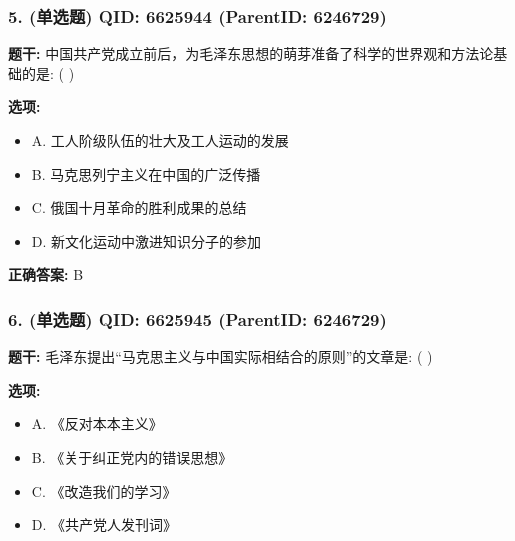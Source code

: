 \documentclass[12pt,UTF8]{ctexart}
\begin{document}
\vspace{0.3em}\hrulefill\vspace{0.7em}

\subsubsection*{5. (单选题) \small QID: 6625944 (ParentID: 6246729)}

\textbf{题干:}
中国共产党成立前后，为毛泽东思想的萌芽准备了科学的世界观和方法论基础的是: ( )



\textbf{选项:}
\begin{itemize}[leftmargin=*]

  \item A. 工人阶级队伍的壮大及工人运动的发展

  \item B. 马克思列宁主义在中国的广泛传播

  \item C. 俄国十月革命的胜利成果的总结

  \item D. 新文化运动中激进知识分子的参加

\end{itemize}

\textbf{正确答案:}
B

\vspace{0.3em}\hrulefill\vspace{0.7em}

\subsubsection*{6. (单选题) \small QID: 6625945 (ParentID: 6246729)}

\textbf{题干:}
毛泽东提出“马克思主义与中国实际相结合的原则”的文章是: ( )



\textbf{选项:}
\begin{itemize}[leftmargin=*]

  \item A. 《反对本本主义》

  \item B. 《关于纠正党内的错误思想》

  \item C. 《改造我们的学习》

  \item D. 《共产党人发刊词》

\end{itemize}
\end{document}
